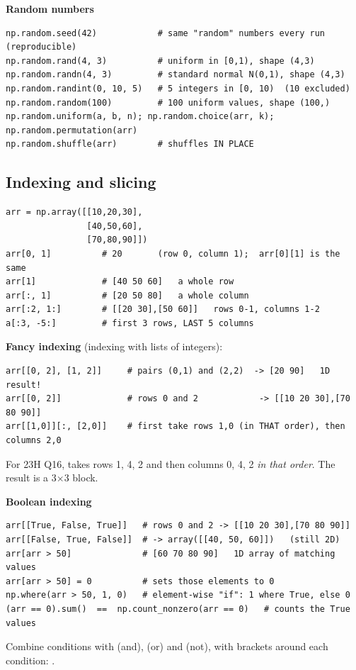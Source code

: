 \textbf{Random numbers}
\begin{codebox}
\begin{Verbatim}
np.random.seed(42)            # same "random" numbers every run (reproducible)
np.random.rand(4, 3)          # uniform in [0,1), shape (4,3)
np.random.randn(4, 3)         # standard normal N(0,1), shape (4,3)
np.random.randint(0, 10, 5)   # 5 integers in [0, 10)  (10 excluded)
np.random.random(100)         # 100 uniform values, shape (100,)
np.random.uniform(a, b, n); np.random.choice(arr, k); np.random.permutation(arr)
np.random.shuffle(arr)        # shuffles IN PLACE
\end{Verbatim}
\end{codebox}

\subsection{Indexing and slicing}
\begin{codebox}
\begin{Verbatim}
arr = np.array([[10,20,30],
                [40,50,60],
                [70,80,90]])
arr[0, 1]          # 20       (row 0, column 1);  arr[0][1] is the same
arr[1]             # [40 50 60]   a whole row
arr[:, 1]          # [20 50 80]   a whole column
arr[:2, 1:]        # [[20 30],[50 60]]   rows 0-1, columns 1-2
a[:3, -5:]         # first 3 rows, LAST 5 columns
\end{Verbatim}
\end{codebox}

\textbf{Fancy indexing} (indexing with lists of integers):
\begin{codebox}
\begin{Verbatim}
arr[[0, 2], [1, 2]]     # pairs (0,1) and (2,2)  -> [20 90]   1D result!
arr[[0, 2]]             # rows 0 and 2            -> [[10 20 30],[70 80 90]]
arr[[1,0]][:, [2,0]]    # first take rows 1,0 (in THAT order), then columns 2,0
\end{Verbatim}
\end{codebox}
For 23H Q16,  takes rows 1, 4, 2 and then columns 0, 4, 2 \emph{in that order}. The result is a 3$\times$3 block.

\textbf{Boolean indexing}
\begin{codebox}
\begin{Verbatim}
arr[[True, False, True]]   # rows 0 and 2 -> [[10 20 30],[70 80 90]]
arr[[False, True, False]]  # -> array([[40, 50, 60]])   (still 2D)
arr[arr > 50]              # [60 70 80 90]   1D array of matching values
arr[arr > 50] = 0          # sets those elements to 0
np.where(arr > 50, 1, 0)   # element-wise "if": 1 where True, else 0
(arr == 0).sum()  ==  np.count_nonzero(arr == 0)   # counts the True values
\end{Verbatim}
\end{codebox}
Combine conditions with \code{\&} (and), \code{|} (or) and \code{\textasciitilde{}} (not), with brackets around each condition: .


